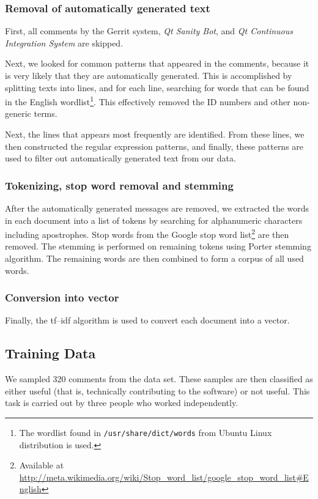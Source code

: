 \documentclass[conference]{IEEEtran}
\begin{document}
\subsubsection{Removal of automatically generated text}

First, all comments by the Gerrit system, \emph{Qt Sanity Bot}, and \emph{Qt Continuous Integration System} are skipped.

Next, we looked for common patterns that appeared in the comments, because it is very likely that they are automatically generated.
This is accomplished by splitting texts into lines, and for each line, searching for words that can be found in the English wordlist\footnote{The wordlist found in \texttt{/usr/share/dict/words} from Ubuntu Linux distribution is used.}.
This effectively removed the ID numbers and other non-generic terms.

Next, the lines that appears most frequently are identified.
From these lines, we then constructed the regular expression patterns,
and finally, these patterns are used to filter out automatically generated text from our data.

\subsubsection{Tokenizing, stop word removal and stemming}

After the automatically generated messages are removed, we extracted the words in each document into a list of tokens by searching for alphanumeric characters including apostrophes.
Stop words from the Google stop word list\footnote{Available at \url{http://meta.wikimedia.org/wiki/Stop_word_list/google_stop_word_list#English}} are then removed.
The stemming is performed on remaining tokens using Porter stemming algorithm.
The remaining words are then combined to form a corpus of all used words.

\subsubsection{Conversion into vector}

Finally, the tf--idf algorithm is used to convert each document into a vector.


\subsection{Training Data}

We sampled 320 comments from the data set.
These samples are then classified as either useful (that is, technically contributing to the software) or not useful.
This task is carried out by three people who worked independently.
\end{document}
